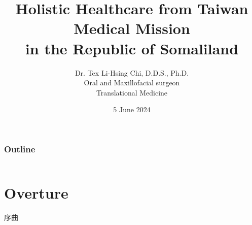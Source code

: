 \documentclass[aspectratio=169]{beamer}
\title{Holistic Healthcare from Taiwan Medical Mission \\ in the Republic of Somaliland}
\author{Dr. Tex Li-Hsing Chi, D.D.S., Ph.D. \\
        Oral and Maxillofacial surgeon \\
        Translational Medicine}
\institute{Taipei Municipal Wanfang Hospital, managed by Taipei Medical University}
\date{5 June 2024} %
\begin{document}


\begin{frame}
\titlepage
\end{frame}

\begin{frame}
\frametitle{Outline}

\begin{columns}
\tableofcontents



\end{columns}


\end{frame}


\section{Overture}

\begin{frame}{序曲}
    \begin{center}
        
    \end{center}
\end{frame}
\end{document}
